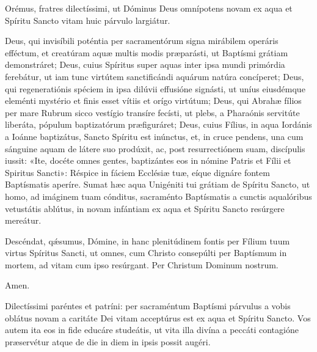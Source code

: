 
Orémus, fratres dilectíssimi, ut Dóminus Deus omnípotens novam ex aqua et
Spíritu Sancto vitam huic párvulo largiátur.


Deus,
qui invisíbili poténtia
per sacramentórum signa mirábilem operáris efféctum,
et creatúram aquæ multis modis præparásti,
ut Baptísmi grátiam demonstráret;
Deus, cuius Spíritus
super aquas inter ipsa mundi primórdia ferebátur,
ut iam tunc virtútem sanctificándi aquárum natúra concíperet;
Deus, qui regeneratiónis spéciem
in ipsa dilúvii effusióne signásti,
ut uníus eiusdémque eleménti mystério
et finis esset vítiis et orígo virtútum;
Deus, qui Abrahæ fílios
per mare Rubrum sicco vestígio transíre fecísti,
ut plebs, a Pharaónis servitúte liberáta,
pópulum baptizatórum præfiguráret;
Deus, cuius Fílius, in aqua Iordánis a Ioánne baptizátus,
Sancto Spíritu est inúnctus,
et, in cruce pendens,
una cum sánguine aquam de látere suo prodúxit,
ac, post resurrectiónem suam, discípulis iussit:
«Ite, docéte omnes gentes,
baptizántes eos in nómine Patris et Fílii et Spiritus Sancti»:
Réspice in fáciem Ecclésiæ tuæ,
eíque dignáre fontem Baptísmatis aperíre.
Sumat hæc aqua Unigéniti tui grátiam de Spíritu Sancto,
ut homo, ad imáginem tuam cónditus,
sacraménto Baptísmatis
a cunctis aqualóribus vetustátis ablútus,
in novam infántiam
ex aqua et Spíritu Sancto resúrgere mereátur.


Descéndat, qǽsumus, Dómine,
in hanc plenitúdinem fontis
per Fílium tuum virtus Spíritus Sancti,
ut omnes, cum Christo consepúlti
per Baptísmum in mortem,
ad vitam cum ipso resúrgant.
Per Christum Dominum nostrum.

 Amen.



Dilectíssimi paréntes et patríni: per sacraméntum Baptísmi párvulus a vobis
oblátus novam a caritáte Dei vitam acceptúrus est ex aqua et Spíritu Sancto. 
Vos autem ita eos in fide educáre studeátis, ut vita illa divína a peccáti
contagióne præservétur atque de die in diem in ipsis possit augéri.

